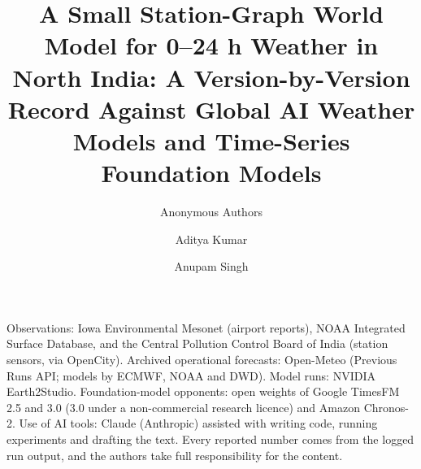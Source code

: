 \documentclass[sigconf,anonymous,review]{acmart}
\begin{document}
\title{A Small Station-Graph World Model for 0--24 h Weather in North India: A Version-by-Version Record Against
Global AI Weather Models and Time-Series Foundation Models}

\ifdefined\anonbuild
\author{Anonymous Authors}
\else
\author{Aditya Kumar}
\author{Anupam Singh}
\renewcommand{\shortauthors}{Kumar and Singh}
\fi



\maketitle











\ifdefined\anonbuild
\else
\begin{acks}
Observations: Iowa Environmental Mesonet (airport reports), NOAA Integrated Surface Database, and the Central
Pollution Control Board of India (station sensors, via OpenCity). Archived operational forecasts: Open-Meteo
(Previous Runs API; models by ECMWF, NOAA and DWD). Model runs: NVIDIA Earth2Studio. Foundation-model opponents:
open weights of Google TimesFM 2.5 and 3.0 (3.0 under a non-commercial research licence) and Amazon Chronos-2.
Use of AI tools: Claude (Anthropic) assisted with writing code, running experiments and drafting the text. Every
reported number comes from the logged run output, and the authors take full responsibility for the content.
\end{acks}
\fi




\appendix

\end{document}
